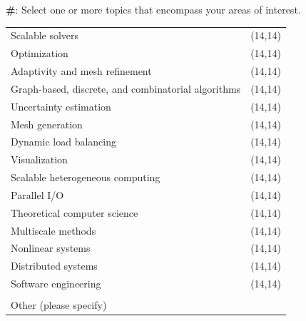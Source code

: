 \documentclass[12pt, letterpaper]{article}
\newcommand{\incrcounter}[1]{\addtocounter{#1}{1}}
\newcounter{questionnum}
\newcounter{subquestionnum}
\newcommand{\question}[2]{\setcounter{subquestionnum}{0} \textbf{\#\thequestionnum}: #1 #2}
\begin{document}
	\question{Select one or more topics that encompass your areas of interest.}{
		\begin{longtable}{l l}
			Scalable solvers & \framebox(14,14){} \\
			Optimization & \framebox(14,14){} \\
			Adaptivity and mesh refinement & \framebox(14,14){} \\
			Graph-based, discrete, and combinatorial algorithms & \framebox(14,14){} \\
			Uncertainty estimation & \framebox(14,14){} \\
			Mesh generation & \framebox(14,14){} \\
			Dynamic load balancing & \framebox(14,14){} \\
			Visualization & \framebox(14,14){} \\
			Scalable heterogeneous computing & \framebox(14,14){} \\
			Parallel I/O & \framebox(14,14){} \\
			Theoretical computer science & \framebox(14,14){} \\
			Multiscale methods & \framebox(14,14){} \\
			Nonlinear systems & \framebox(14,14){} \\
			Distributed systems & \framebox(14,14){} \\
			Software engineering & \framebox(14,14){} \\
			\\
			Other (please specify) & { \fbox{\TextField[name=otherinterests,height=1cm,width=5cm,charsize=12pt]{}}   } \\ %
		\end{longtable}
	} \incrcounter{questionnum}
	
	\pagebreak
	
\end{document}
